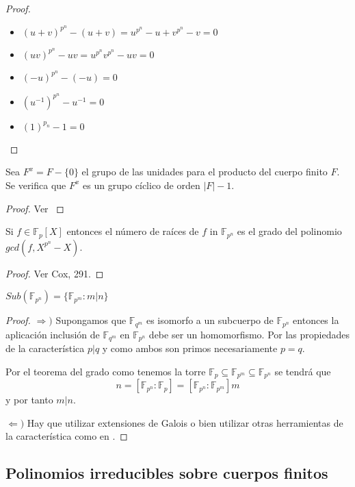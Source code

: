 \begin{proof}
\begin{itemize}
\item $(u+v)^{p^n} - (u+v) = u^{p^n}-u+v^{p^n}-v = 0$
\item $(uv)^{p^n}-uv = u^{p^n}v^{p^n} - uv = 0$
\item $(-u)^{p^n} - (-u) = 0$
\item $(u^{-1})^{p^n} - u^{-1} = 0$
\item $(1)^{p_n} - 1 = 0$
\end{itemize}
\end{proof}

\begin{proposition}
	Sea $F^x = F - \{0\}$ el grupo de las unidades para el producto del cuerpo finito $F$. Se verifica que $F^x$ es un grupo cíclico de orden $|F|-1$. 
\end{proposition}
\begin{proof}
	Ver \cite{link2}
\end{proof}

\begin{proposition}
	Si $f \in \mathbb{F}_p[X]$ entonces el número de raíces de $f$ in $\mathbb{F}_{p^n}$ es el grado del polinomio $gcd(f,X^{p^n}-X)$.
\end{proposition}
\begin{proof}
	Ver Cox, 291.
\end{proof}

\begin{proposition}
	$Sub(\mathbb{F}_{p^n}) = \{\mathbb{F}_{p^m}:m|n\}$
\end{proposition}
\begin{proof}
	$\Rightarrow)$ Supongamos que $\mathbb{F}_{q^m}$ es isomorfo a un subcuerpo de $\mathbb{F}_{p^n}$ entonces la aplicación inclusión de $\mathbb{F}_{q^m}$ en $\mathbb{F}_{p^n}$ debe ser un homomorfismo. Por las propiedades de la característica $p|q$ y como ambos son primos necesariamente $p = q$. 
	
	Por el teorema del grado como tenemos la torre $\mathbb{F}_{p} \subseteq \mathbb{F}_{p^m} \subseteq \mathbb{F}_{p^n}$ se tendrá que $$n = [\mathbb{F}_{p^n}:\mathbb{F}_{p}] = [\mathbb{F}_{p^n}:\mathbb{F}_{p^m}]m$$ y por tanto $m|n$. 
	
	$\Leftarrow)$ Hay que utilizar extensiones de Galois o bien utilizar otras herramientas de la característica como en \cite{4}.
\end{proof}


\subsection{Polinomios irreducibles sobre cuerpos finitos}

